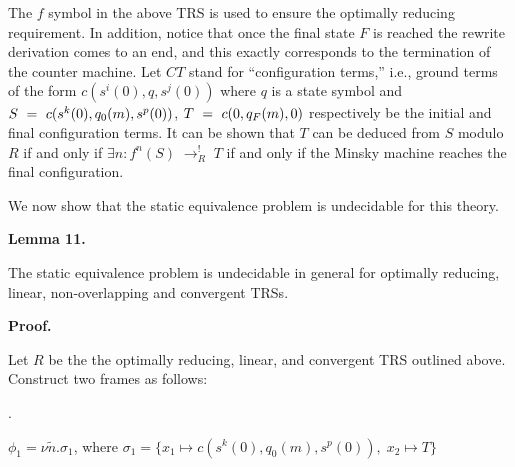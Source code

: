  
The $f$ symbol in the above TRS is used to ensure the optimally reducing requirement. In addition, notice that once the final state $F$ is reached the rewrite derivation comes to an end, and this exactly corresponds to the termination of the counter machine. Let $CT$ stand for “configuration terms,” i.e., ground terms of the form $c(s^{i}(0),q,s^{j}(0))$ where $q$ is a state symbol and $S\leavevmode\nobreak\ =\leavevmode\nobreak\ c(s^{k}(0),q_{0}(m),s^{p}(0))$, $T\leavevmode\nobreak\ =\leavevmode\nobreak\ c(0,q_{F}(m),0)$ respectively be the initial and final configuration terms. It can be shown that $T$ can be deduced from $S$ modulo $R$ if and only if $\exists n:f^{n}(S)\;\rightarrow_{R}^{!}\;T$ if and only if the Minsky machine reaches the final configuration.\par
 
 
 
We now show that the static equivalence problem is undecidable for this theory.\par
 
 
 
\par\medskip\noindent\textbf{Lemma 11.}\par
 
 
The static equivalence problem is undecidable in general for optimally reducing, linear, non-overlapping and convergent TRSs.\par
 
 
 
 
\par\medskip\noindent\textbf{Proof.}\par
 
 
Let $R$ be the the optimally reducing, linear, and convergent TRS outlined above. Construct two frames as follows:\par
  
\par{}. 
 
$\phi_{1}=\nu\tilde{n}.\sigma_{1}$, where $\sigma_{1}=\{x_{1}\mapsto c(s^{k}(0),q_{0}(m),s^{p}(0)),\;x_{2}\mapsto T\}$\par
 

